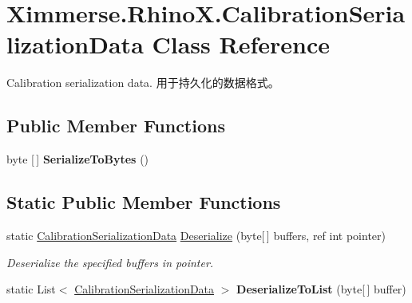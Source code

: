 \hypertarget{class_ximmerse_1_1_rhino_x_1_1_calibration_serialization_data}{}\section{Ximmerse.\+Rhino\+X.\+Calibration\+Serialization\+Data Class Reference}
\label{class_ximmerse_1_1_rhino_x_1_1_calibration_serialization_data}


Calibration serialization data. 用于持久化的数据格式。  


\subsection*{Public Member Functions}
\begin{DoxyCompactItemize}
\item 
\mbox{\label{class_ximmerse_1_1_rhino_x_1_1_calibration_serialization_data_acf57cae12382f29c523b48463346eba3}} 
byte \mbox{[}$\,$\mbox{]} {\bfseries Serialize\+To\+Bytes} ()
\end{DoxyCompactItemize}
\subsection*{Static Public Member Functions}
\begin{DoxyCompactItemize}
\item 
static \mbox{\hyperlink{class_ximmerse_1_1_rhino_x_1_1_calibration_serialization_data}{Calibration\+Serialization\+Data}} \mbox{\hyperlink{class_ximmerse_1_1_rhino_x_1_1_calibration_serialization_data_ab86d9a60c838e8fe8503f0b9126ef86e}{Deserialize}} (byte\mbox{[}$\,$\mbox{]} buffers, ref int pointer)
\begin{DoxyCompactList}\small\item\em Deserialize the specified buffers in pointer. \end{DoxyCompactList}\item 
\mbox{\label{class_ximmerse_1_1_rhino_x_1_1_calibration_serialization_data_abc749af23b37e44fa30a78afe8272f9e}} 
static List$<$ \mbox{\hyperlink{class_ximmerse_1_1_rhino_x_1_1_calibration_serialization_data}{Calibration\+Serialization\+Data}} $>$ {\bfseries Deserialize\+To\+List} (byte\mbox{[}$\,$\mbox{]} buffer)
\end{DoxyCompactItemize}
